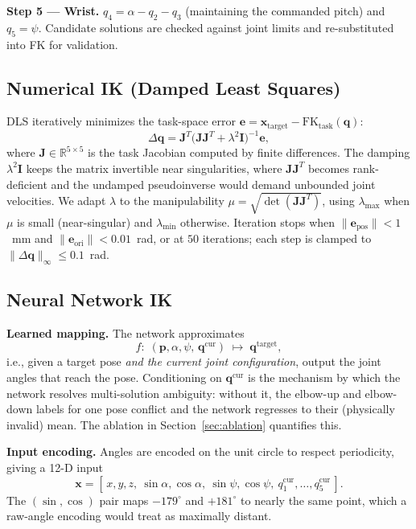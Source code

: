 \documentclass[conference]{IEEEtran}
\begin{document}
\textbf{Step 5 --- Wrist.} $q_4 = \alpha - q_2 - q_3$ (maintaining the commanded pitch) and $q_5 = \psi$. Candidate solutions are checked against joint limits and re-substituted into FK for validation.

\subsection{Numerical IK (Damped Least Squares)}
\label{sec:numerical}

DLS iteratively minimizes the task-space error $\mathbf{e} = \mathbf{x}_{\mathrm{target}} - \mathrm{FK}_{\mathrm{task}}(\mathbf{q})$:
\begin{equation}
\Delta\mathbf{q} = \mathbf{J}^{T}\big(\mathbf{J}\mathbf{J}^{T} + \lambda^2 \mathbf{I}\big)^{-1}\mathbf{e},
\label{eq:dls}
\end{equation}
where $\mathbf{J}\in\mathbb{R}^{5\times5}$ is the task Jacobian computed by finite differences. The damping $\lambda^2\mathbf{I}$ keeps the matrix invertible near singularities, where $\mathbf{J}\mathbf{J}^{T}$ becomes rank-deficient and the undamped pseudoinverse would demand unbounded joint velocities. We adapt $\lambda$ to the manipulability $\mu=\sqrt{\det(\mathbf{J}\mathbf{J}^{T})}$, using $\lambda_{\max}$ when $\mu$ is small (near-singular) and $\lambda_{\min}$ otherwise. Iteration stops when $\|\mathbf{e}_{\mathrm{pos}}\|<1$~mm and $\|\mathbf{e}_{\mathrm{ori}}\|<0.01$~rad, or at $50$ iterations; each step is clamped to $\|\Delta\mathbf{q}\|_\infty \le 0.1$~rad.

\subsection{Neural Network IK}
\label{sec:neural}

\textbf{Learned mapping.} The network approximates
\begin{equation}
f:\; (\mathbf{p}, \alpha, \psi,\, \mathbf{q}^{\mathrm{cur}}) \;\longmapsto\; \mathbf{q}^{\mathrm{target}},
\end{equation}
i.e., given a target pose \emph{and the current joint configuration}, output the joint angles that reach the pose. Conditioning on $\mathbf{q}^{\mathrm{cur}}$ is the mechanism by which the network resolves multi-solution ambiguity: without it, the elbow-up and elbow-down labels for one pose conflict and the network regresses to their (physically invalid) mean. The ablation in Section~\ref{sec:ablation} quantifies this.

\textbf{Input encoding.} Angles are encoded on the unit circle to respect periodicity, giving a 12-D input
\begin{equation}
\mathbf{x} = [\,x, y, z,\ \sin\alpha, \cos\alpha,\ \sin\psi, \cos\psi,\ q_1^{\mathrm{cur}},\dots,q_5^{\mathrm{cur}}\,].
\end{equation}
The $(\sin,\cos)$ pair maps $-179^{\circ}$ and $+181^{\circ}$ to nearly the same point, which a raw-angle encoding would treat as maximally distant.
\end{document}
